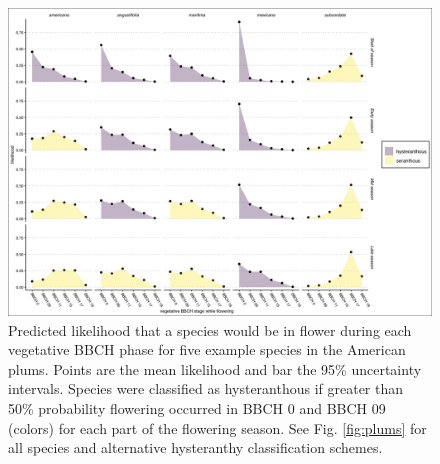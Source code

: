 \documentclass{article}[11pt]
\begin{document}
{   %

\begin{figure}[h!]
    \centering
 \includegraphics[width=\textwidth]{..//..//Plots/ord_quants_exmpsps.jpeg}
    \caption{Predicted likelihood that a species would be in flower during each vegetative BBCH phase for five example species in the American plums. Points are the mean likelihood and bar the 95\% uncertainty intervals. Species were classified as hysteranthous if greater than 50\% probability flowering occurred in BBCH 0 and BBCH 09 (colors) for each part of the flowering season.
  See Fig. \ref{fig:plums} for all species and alternative hysteranthy classification schemes. }
    \label{fig:ordinals}
\end{figure}





}
\end{document}
